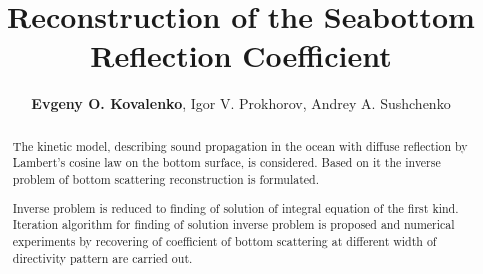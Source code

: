 \documentclass{procDDs}
\title{Reconstruction of the Seabottom Reflection Coefficient}
\author{\textbf{Evgeny O. Kovalenko}, Igor V. Prokhorov, Andrey A. Sushchenko}%
{Institute for Applied Mathematics, FEB RAS, Vladivostok, Russia, \\ 
Far Eastern Federal University, Vladivostok, Russia}                 %
{kovalenko.eo@dvfu.ru, sushchenko.aa@dvfu.ru}                                   %
\begin{document}
\maketitle

\def\k{\mathbf{k}}
\def\n{\mathbf{n}}
\def\x{\mathbf{x}}
\def\y{\mathbf{y}}
\def\r{\mathbf{r}}
\def\p{\mathbf{|}}
\def\z{\mathbf{z}}
\def\V{\mathbf{V}}
\def\Vt{\mathbf{V}t}
\def\exp{\text{exp}}

\begin{abstract}
   The kinetic model, describing sound propagation in the ocean with diffuse reflection by Lambert's cosine law on the bottom surface, is considered. Based on it the inverse problem of bottom scattering reconstruction is formulated.
   
   Inverse problem is reduced to finding of solution of integral equation of the first kind. Iteration algorithm for finding of solution inverse problem is proposed and numerical experiments by recovering of coefficient of bottom scattering at different width of directivity pattern are carried out.
\end{abstract}
\end{document}
